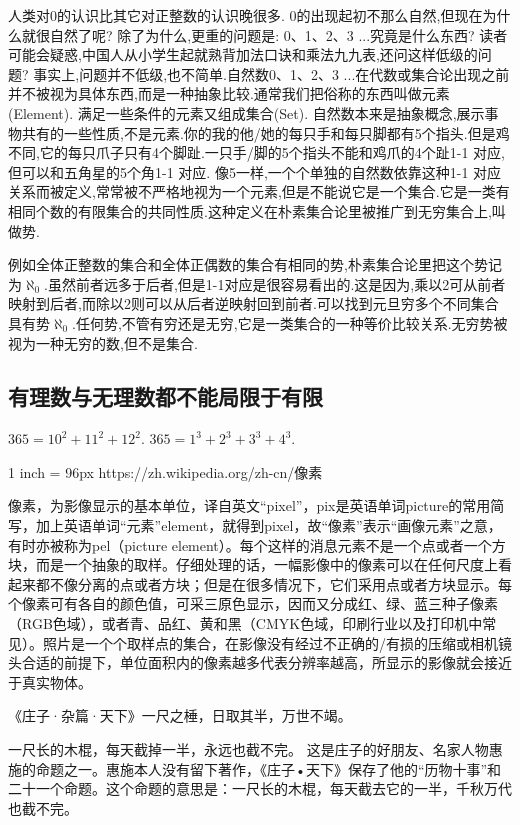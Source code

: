 \documentclass[main.tex]{subfiles}
\begin{document}
人类对0的认识比其它对正整数的认识晚很多. 0的出现起初不那么自然,但现在为什么就很自然了呢?
除了为什么,更重的问题是: 0、1、2、3 ...究竟是什么东西?
读者可能会疑惑,中国人从小学生起就熟背加法口诀和乘法九九表,还问这样低级的问题?
事实上,问题并不低级,也不简单.自然数0、1、2、3 ...在代数或集合论出现之前并不被视为具体东西,而是一种抽象比较.通常我们把俗称的东西叫做元素(Element).
满足一些条件的元素又组成集合(Set).
自然数本来是抽象概念,展示事物共有的一些性质,不是元素.你的我的他/她的每只手和每只脚都有5个指头.但是鸡不同,它的每只爪子只有4个脚趾.一只手/脚的5个指头不能和鸡爪的4个趾1-1 对应,但可以和五角星的5个角1-1 对应.
像5一样,一个个单独的自然数依靠这种1-1 对应关系而被定义,常常被不严格地视为一个元素,但是不能说它是一个集合.它是一类有相同个数的有限集合的共同性质.这种定义在朴素集合论里被推广到无穷集合上,叫做势.

例如全体正整数的集合和全体正偶数的集合有相同的势,朴素集合论里把这个势记为$\aleph_0$.虽然前者远多于后者,但是1-1对应是很容易看出的.这是因为,乘以2可从前者映射到后者,而除以2则可以从后者逆映射回到前者.可以找到元旦穷多个不同集合具有势$\aleph_0$.任何势,不管有穷还是无穷,它是一类集合的一种等价比较关系.无穷势被视为一种无穷的数,但不是集合.

\subsection{有理数与无理数都不能局限于有限}

$365=10^2+11^2+12^2$.
$365=1^3+2^3+3^3+4^3$.


1 inch = 96px
https://zh.wikipedia.org/zh-cn/像素

像素，为影像显示的基本单位，译自英文“pixel”，pix是英语单词picture的常用简写，加上英语单词“元素”element，就得到pixel，故“像素”表示“画像元素”之意，有时亦被称为pel（picture element）。每个这样的消息元素不是一个点或者一个方块，而是一个抽象的取样。仔细处理的话，一幅影像中的像素可以在任何尺度上看起来都不像分离的点或者方块；但是在很多情况下，它们采用点或者方块显示。每个像素可有各自的颜色值，可采三原色显示，因而又分成红、绿、蓝三种子像素（RGB色域），或者青、品红、黄和黑（CMYK色域，印刷行业以及打印机中常见）。照片是一个个取样点的集合，在影像没有经过不正确的/有损的压缩或相机镜头合适的前提下，单位面积内的像素越多代表分辨率越高，所显示的影像就会接近于真实物体。


《庄子·杂篇·天下》一尺之棰，日取其半，万世不竭。

一尺长的木棍，每天截掉一半，永远也截不完。
这是庄子的好朋友、名家人物惠施的命题之一。惠施本人没有留下著作，《庄子•天下》保存了他的“历物十事”和二十一个命题。这个命题的意思是：一尺长的木棍，每天截去它的一半，千秋万代也截不完。
\end{document}
